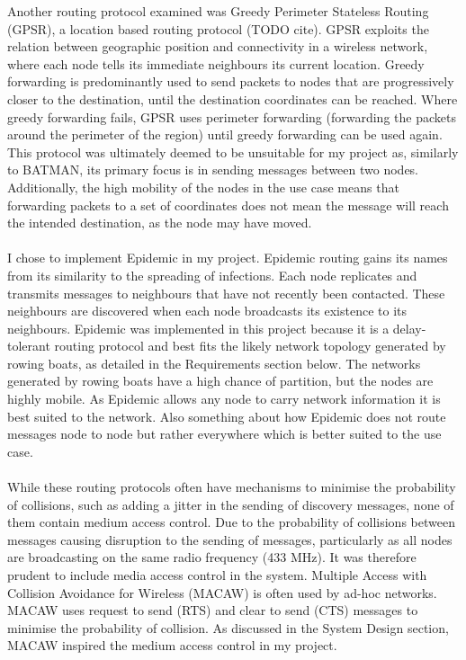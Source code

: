 \documentclass[12pt,a4paper]{report}
\begin{document}
Another routing protocol examined was Greedy Perimeter Stateless Routing (GPSR), a location based routing protocol (TODO cite). GPSR exploits the relation between geographic position and connectivity in a wireless network, where each node tells its immediate neighbours its current location. Greedy forwarding is predominantly used to send packets to nodes that are progressively closer to the destination, until the destination coordinates can be reached. Where greedy forwarding fails, GPSR uses perimeter forwarding (forwarding the packets around the perimeter of the region) until greedy forwarding can be used again. This protocol was ultimately deemed to be unsuitable for my project as, similarly to BATMAN, its primary focus is in sending messages between two nodes. Additionally, the high mobility of the nodes in the use case means that forwarding packets to a set of coordinates does not mean the message will reach the intended destination, as the node may have moved. \\ \\ 
I chose to implement Epidemic in my project. Epidemic routing gains its names from its similarity to the spreading of infections. Each node replicates and transmits messages to neighbours that have not recently been contacted. These neighbours are discovered when each node broadcasts its existence to its neighbours. Epidemic was implemented in this project because it is a delay-tolerant routing protocol and best fits the likely network topology generated by rowing boats, as detailed in the Requirements section below. The networks generated by rowing boats have a high chance of partition, but the nodes are highly mobile. As Epidemic allows any node to carry network information it is best suited to the network.  Also something about how Epidemic does not route messages node to node but rather everywhere which is better suited to the use case. \\ \\
While these routing protocols often have mechanisms to minimise the probability of collisions, such as adding a jitter in the sending of discovery messages, none of them contain medium access control. Due to the probability of collisions between messages causing disruption to the sending of messages, particularly as all nodes are broadcasting on the same radio frequency (433 MHz). It was  therefore prudent to include media access control in the system. Multiple Access with Collision Avoidance for Wireless (MACAW) is often used by ad-hoc networks. MACAW uses request to send (RTS) and clear to send (CTS) messages to minimise the probability of collision. As discussed in the System Design section, MACAW inspired the medium access control in my project. 
\end{document}
